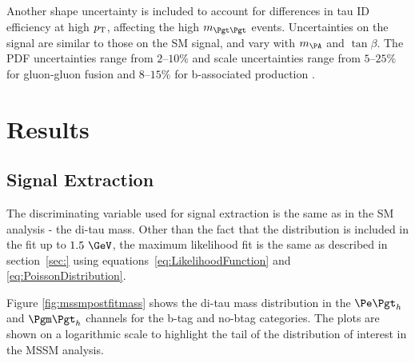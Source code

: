 Another shape uncertainty is included to account for differences in tau ID
efficiency at high $p_{\mathrm{T}}$, affecting the high $m_{\Pgt\Pgt}$ events. 
Uncertainties on the signal are similar to those on the \ac{SM} signal, and vary
with $m_{\PA}$ and $\tan\beta$. The \ac{PDF} uncertainties range from $2$--$10\%$ and scale uncertainties range from
$5$--$25\%$ for gluon-gluon fusion and $8$--$15\%$ for b-associated production
\cite{CMS-PAS-HIG-13-021}.

\section{Results}
\label{sec:mssmResults}

\subsection{Signal Extraction}
\label{sec:mssmSignalExtraction}

The discriminating variable used for signal extraction is the same as in the
\ac{SM} analysis - the di-tau mass. Other than the fact that the distribution is
included in the fit up to $1.5~\GeV$, the maximum likelihood fit is the same as
described in section~\ref{sec:} using equations~\ref{eq:LikelihoodFunction} and
\ref{eq:PoissonDistribution}.

Figure \ref{fig:mssmpostfitmass} shows the di-tau mass distribution in the
$\etau$ and $\mutau$ channels for the b-tag and no-btag categories. The plots
are shown on a logarithmic scale to highlight the tail of the distribution of
interest in the \ac{MSSM} analysis. 

